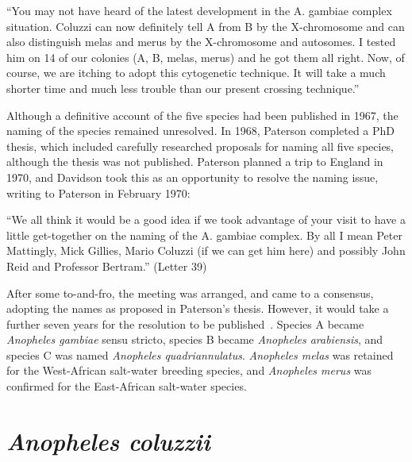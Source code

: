 \documentclass[a4paper,11pt,abstracton,hidelinks]{scrartcl}
\begin{document}
\begin{displayquote}
``You may not have heard of the latest development in the A. gambiae complex situation. Coluzzi can now definitely tell A from B by the X-chromosome and can also distinguish melas and merus by the X-chromosome and autosomes. I tested him on 14 of our colonies (A, B, melas, merus) and he got them all right. Now, of course, we are itching to adopt this cytogenetic technique. It will take a much shorter time and much less trouble than our present crossing technique.''
\end{displayquote}


Although a definitive account of the five species had been published in 1967, the naming of the species remained unresolved.
%
In 1968, Paterson completed a PhD thesis, which included carefully researched proposals for naming all five species, although the thesis was not published.
%
Paterson planned a trip to England in 1970, and Davidson took this as an opportunity to resolve the naming issue, writing to Paterson in February 1970:


\begin{displayquote}
``We all think it would be a good idea if we took advantage of your visit to have a little get-together on the naming of the A. gambiae complex. By all I mean Peter Mattingly, Mick Gillies, Mario Coluzzi (if we can get him here) and possibly John Reid and Professor Bertram.'' (Letter 39)
\end{displayquote}


After some to-and-fro, the meeting was arranged, and came to a consensus, adopting the names as proposed in Paterson's thesis.
%
However, it would take a further seven years for the resolution to be published~\parencite{Mattingly1977}.
%
Species A became \textit{Anopheles gambiae} sensu stricto, species B became \textit{Anopheles arabiensis}, and species C was named \textit{Anopheles quadriannulatus}.
%
\textit{Anopheles melas} was retained for the West-African salt-water breeding species, and \textit{Anopheles merus} was confirmed for the East-African salt-water species.


\section{\textit{Anopheles coluzzii}}\label{sec:anopheles-coluzzii}
\end{document}
